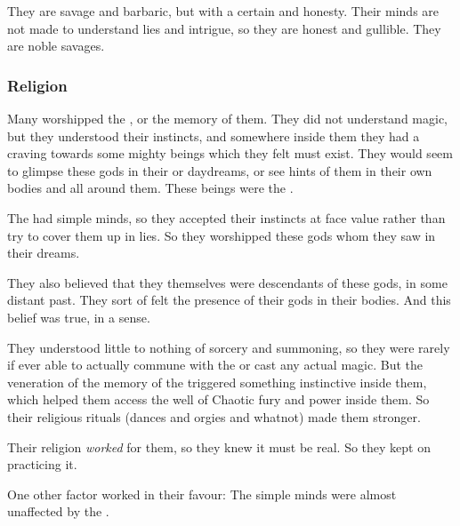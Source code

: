 They are savage and barbaric, but with a certain \naivete{} and honesty. 
Their minds are not made to understand lies and intrigue, so they are honest and gullible. 
They are noble savages. 





\subsubsection{Religion}
Many \cregorrs{} worshipped the \xss, or the memory of them. 
They did not understand magic, but they understood their instincts, and somewhere inside them they had a craving towards some mighty beings which they felt must exist. 
They would seem to glimpse these gods in their  or daydreams, or see hints of them in their own bodies and all around them. 
These beings were the \xss. 

The \cregorrs{} had simple minds, so they accepted their instincts at face value rather than try to cover them up in lies. 
So they worshipped these gods whom they saw in their dreams. 

They also believed that they themselves were descendants of these gods, in some distant past. 
They sort of felt the presence of their gods in their bodies. 
And this belief was true, in a sense. 

They understood little to nothing of sorcery and summoning, so they were rarely if ever able to actually commune with the \xss{} or cast any actual magic. 
But the veneration of the memory of the \xss{} triggered something instinctive inside them, which helped them access the well of Chaotic \xsic{} fury and power inside them. 
So their religious rituals (dances and orgies and whatnot) made them stronger. 

Their religion \emph{worked} for them, so they knew it must be real. 
So they kept on practicing it. 

One other factor worked in their favour: 
The simple \cregorr{} minds were almost unaffected by the . 















\section{\Dragon}
\index{\dragon}









